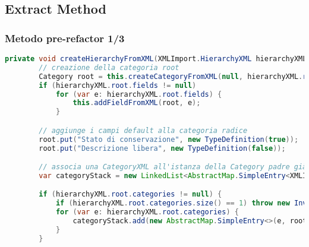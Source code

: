\subsection{Extract Method}
\begin{frame}[fragile]
    \frametitle{Metodo pre-refactor 1/3}

    \lstset{style=tiny_java}
    \begin{lstlisting}[language=java, caption={Snippet tratto da v5, Controller.java}]
private void createHierarchyFromXML(XMLImport.HierarchyXML hierarchyXML) throws DuplicateCategoryException, InvalidCategoryException, DuplicateFieldException, InvalidFieldException, SQLException {
        // creazione della categoria root
        Category root = this.createCategoryFromXML(null, hierarchyXML.root);
        if (hierarchyXML.root.fields != null)
            for (var e: hierarchyXML.root.fields) {
                this.addFieldFromXML(root, e);
            }

        // aggiunge i campi default alla categoria radice
        root.put("Stato di conservazione", new TypeDefinition(true));
        root.put("Descrizione libera", new TypeDefinition(false));

        // associa una CategoryXML all'istanza della Category padre già creata
        var categoryStack = new LinkedList<AbstractMap.SimpleEntry<XMLImport.CategoryXML, Category>>();

        if (hierarchyXML.root.categories != null) {
            if (hierarchyXML.root.categories.size() == 1) throw new InvalidCategoryException();
            for (var e: hierarchyXML.root.categories) {
                categoryStack.add(new AbstractMap.SimpleEntry<>(e, root));
            }
        }
    \end{lstlisting}
\end{frame}

